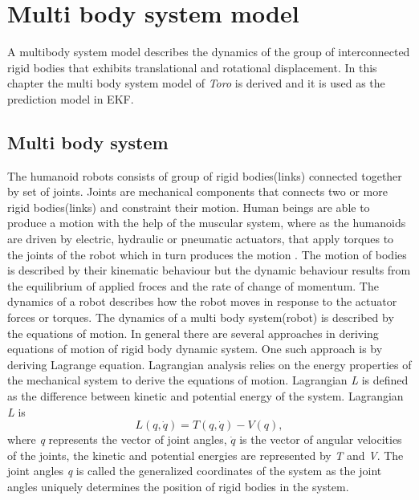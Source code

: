 \chapter{Multi body system model}
\label{ch:multi_mdl}
A multibody system model describes the dynamics of the group of interconnected rigid bodies that exhibits translational and rotational displacement. In this chapter the multi body system model of \emph{Toro} is derived and it is used as the prediction model in EKF.

\section{Multi body system}
The humanoid robots consists of group of rigid bodies(links) connected together by set of joints. Joints are mechanical components that connects two or more rigid bodies(links) and constraint their motion. Human beings are able to produce a motion with the help of the muscular system, where as the humanoids are driven by electric, hydraulic or pneumatic actuators, that apply torques to the joints of the robot which in turn produces the motion \cite[Chapter 2]{mur94}. The motion of bodies is described by their kinematic behaviour but the dynamic behaviour results from the equilibrium of applied froces and the rate of change of momentum. The dynamics of a robot describes how the robot moves in response to the actuator forces or torques. The dynamics of a multi body system(robot) is described by the equations of motion. In general there are several approaches in deriving equations of motion of rigid body dynamic system. One such approach is by deriving Lagrange equation. Lagrangian analysis relies on the energy properties of the mechanical system to derive the equations of motion. Lagrangian \emph{L} is defined as the difference between kinetic and potential energy of the system. Lagrangian \emph{L} is $$ L(q,\dot{q}) = T(q,\dot{q}) - V(q),$$ 
where \emph{q} represents the vector of joint angles, $\dot{q}$ is the vector of angular velocities of the joints, the kinetic and potential energies are represented by \emph{T} and \emph{V}. The joint angles \emph{q} is called the generalized coordinates of the system as the joint angles uniquely determines the position of rigid bodies in the system.

